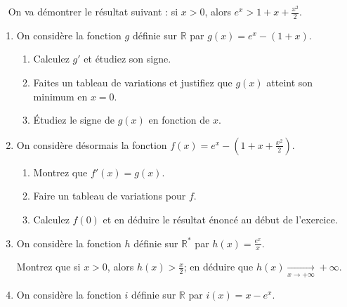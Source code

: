 \documentclass[a4paper,12pt]{exam}
\newcommand{\exercice}[2]{\qformat{\textbf{Exercice \thequestion}#1\hfill\textbf{#2}}\question\ }
\newcommand{\exop}[1]{\exercice{}{#1pt}}
\begin{document}
\begin{questions}
\exop{7}
On va démontrer le résultat suivant : si $x>0$, alors $e^x>1+x+\tfrac{x^2}2$.

\begin{enumerate}
 \item On considère la fonction $g$ définie sur $\mathbb R$ par $g(x)=e^x-(1+x)$.
 \begin{enumerate}
 \item Calculez $g'$ et étudiez son signe.
 \item Faites un tableau de variations et justifiez que $g(x)$ atteint son minimum en $x=0$.
 \item Étudiez le signe de $g(x)$ en fonction de $x$.
 \end{enumerate}
 \item On considère désormais la fonction $f(x)=e^x-(1+x+\tfrac{x^2}2)$.
 \begin{enumerate}
  \item Montrez que $f'(x)=g(x)$.
  \item Faire un tableau de variations pour $f$.
  \item Calculez $f(0)$ et en déduire le résultat énoncé au début de l'exercice.
 \end{enumerate}
 \item On considère la fonction $h$ définie sur $\mathbb R^*$ par $h(x)=\tfrac{e^x}x$.
 
 Montrez que si $x>0$, alors $h(x)>\tfrac{x}{2}$; en déduire que $h(x)\xrightarrow[x\rightarrow+\infty]{}+\infty$.
 \item On considère la fonction $i$ définie sur $\mathbb R$ par $i(x)=x-e^x$.
 

\end{enumerate}
\end{questions}
\end{document}
